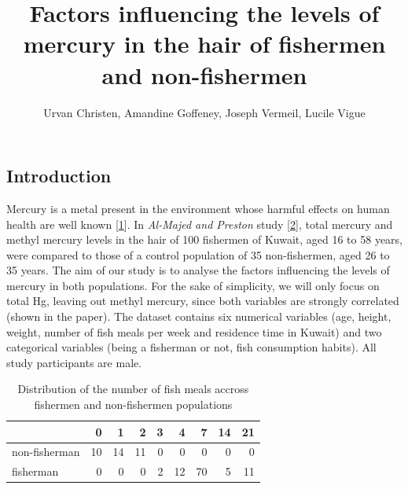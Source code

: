 \documentclass[12pt,]{article}
\title{Factors influencing the levels of mercury in the hair of fishermen and
non-fishermen}
\author{Urvan Christen, Amandine Goffeney, Joseph Vermeil, Lucile Vigue}
\date{}
\begin{document}
\maketitle

\subsection{Introduction}\label{introduction}

Mercury is a metal present in the environment whose harmful effects on
human health are well known
{[}\protect\hyperlink{ref-park2012human}{1}{]}. In \emph{Al-Majed and
Preston} study {[}\protect\hyperlink{ref-al2000factors}{2}{]}, total
mercury and methyl mercury levels in the hair of 100 fishermen of
Kuwait, aged 16 to 58 years, were compared to those of a control
population of 35 non-fishermen, aged 26 to 35 years. The aim of our
study is to analyse the factors influencing the levels of mercury in
both populations. For the sake of simplicity, we will only focus on
total Hg, leaving out methyl mercury, since both variables are strongly
correlated (shown in the paper). The dataset contains six numerical
variables (age, height, weight, number of fish meals per week and
residence time in Kuwait) and two categorical variables (being a
fisherman or not, fish consumption habits). All study participants are
male.

\begin{table}[t]

\caption{\label{tab:unnamed-chunk-6}\label{tbl:fishmlwk}Distribution of the number of fish meals accross fishermen and non-fishermen populations}
\centering
\begin{tabular}{lrrrrrrrr}
\toprule
  & 0 & 1 & 2 & 3 & 4 & 7 & 14 & 21\\
\midrule
\rowcolor{gray!6}  non-fisherman & 10 & 14 & 11 & 0 & 0 & 0 & 0 & 0\\
fisherman & 0 & 0 & 0 & 2 & 12 & 70 & 5 & 11\\
\bottomrule
\end{tabular}
\end{table}
\end{document}

